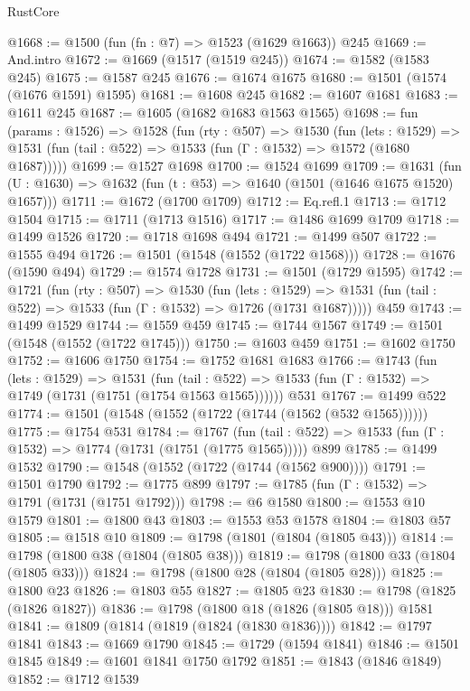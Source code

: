 \begin{lexlean}{RustCore}
\begin{coremodule}
@1668 := @1500 (fun (fn : @7) => @1523 (@1629 @1663)) @245
@1669 := And.intro
@1672 := @1669 (@1517 (@1519 @245))
@1674 := @1582 (@1583 @245)
@1675 := @1587 @245
@1676 := @1674 @1675
@1680 := @1501 (@1574 (@1676 @1591) @1595)
@1681 := @1608 @245
@1682 := @1607 @1681
@1683 := @1611 @245
@1687 := @1605 (@1682 @1683 @1563 @1565)
@1698 := fun (params : @1526) =>
  @1528
    (fun (rty : @507) =>
    @1530
      (fun (lets : @1529) =>
      @1531 (fun (tail : @522) => @1533 (fun (Γ : @1532) => @1572 (@1680 @1687)))))
@1699 := @1527 @1698
@1700 := @1524 @1699
@1709 := @1631 (fun (U : @1630) => @1632 (fun (t : @53) => @1640 (@1501 (@1646 @1675 @1520) @1657)))
@1711 := @1672 (@1700 @1709)
@1712 := Eq.refl.{1}
@1713 := @1712 @1504
@1715 := @1711 (@1713 @1516)
@1717 := @1486 @1699 @1709
@1718 := @1499 @1526
@1720 := @1718 @1698 @494
@1721 := @1499 @507
@1722 := @1555 @494
@1726 := @1501 (@1548 (@1552 (@1722 @1568)))
@1728 := @1676 (@1590 @494)
@1729 := @1574 @1728
@1731 := @1501 (@1729 @1595)
@1742 := @1721
    (fun (rty : @507) =>
    @1530
      (fun (lets : @1529) =>
      @1531 (fun (tail : @522) => @1533 (fun (Γ : @1532) => @1726 (@1731 @1687)))))
    @459
@1743 := @1499 @1529
@1744 := @1559 @459
@1745 := @1744 @1567
@1749 := @1501 (@1548 (@1552 (@1722 @1745)))
@1750 := @1603 @459
@1751 := @1602 @1750
@1752 := @1606 @1750
@1754 := @1752 @1681 @1683
@1766 := @1743
    (fun (lets : @1529) =>
    @1531
      (fun (tail : @522) => @1533 (fun (Γ : @1532) => @1749 (@1731 (@1751 (@1754 @1563 @1565))))))
    @531
@1767 := @1499 @522
@1774 := @1501 (@1548 (@1552 (@1722 (@1744 (@1562 (@532 @1565))))))
@1775 := @1754 @531
@1784 := @1767
    (fun (tail : @522) => @1533 (fun (Γ : @1532) => @1774 (@1731 (@1751 (@1775 @1565)))))
    @899
@1785 := @1499 @1532
@1790 := @1548 (@1552 (@1722 (@1744 (@1562 @900))))
@1791 := @1501 @1790
@1792 := @1775 @899
@1797 := @1785 (fun (Γ : @1532) => @1791 (@1731 (@1751 @1792)))
@1798 := @6 @1580
@1800 := @1553 @10 @1579
@1801 := @1800 @43
@1803 := @1553 @53 @1578
@1804 := @1803 @57
@1805 := @1518 @10
@1809 := @1798 (@1801 (@1804 (@1805 @43)))
@1814 := @1798 (@1800 @38 (@1804 (@1805 @38)))
@1819 := @1798 (@1800 @33 (@1804 (@1805 @33)))
@1824 := @1798 (@1800 @28 (@1804 (@1805 @28)))
@1825 := @1800 @23
@1826 := @1803 @55
@1827 := @1805 @23
@1830 := @1798 (@1825 (@1826 @1827))
@1836 := @1798 (@1800 @18 (@1826 (@1805 @18))) @1581
@1841 := @1809 (@1814 (@1819 (@1824 (@1830 @1836))))
@1842 := @1797 @1841
@1843 := @1669 @1790
@1845 := @1729 (@1594 @1841)
@1846 := @1501 @1845
@1849 := @1601 @1841 @1750 @1792
@1851 := @1843 (@1846 @1849)
@1852 := @1712 @1539

\end{coremodule}
\end{lexlean}
